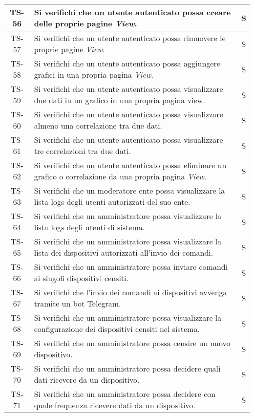 \begin{center}
\begin{longtable}{|c|p{10cm}|c|}
			 \hline
			 TS-56 & Si verifichi che un utente autenticato possa creare delle proprie pagine \textit{View}. & S \\
			 \hline
			 TS-57 & Si verifichi che un utente autenticato possa rimuovere le proprie pagine \textit{View}. & S \\
			 \hline
			 TS-58 & Si verifichi che un utente autenticato possa aggiungere grafici in una propria pagina  \textit{View}. & S \\
			 \hline
			 TS-59 & Si verifichi che un utente autenticato possa visualizzare due dati in un grafico in una propria pagina view. & S \\
			 \hline
			 TS-60 & Si verifichi che un utente autenticato possa visualizzare almeno una correlazione tra due dati. & S \\
			 \hline
			 TS-61 & Si verifichi che un utente autenticato possa visualizzare tre correlazioni tra due dati. & S \\
			 \hline
			 TS-62 & Si verifichi che un utente autenticato possa eliminare un grafico o correlazione da una propria pagina \textit{View}. & S \\
			 \hline
			 TS-63 & Si verifichi che un moderatore ente possa visualizzare la lista logs degli utenti autorizzati del suo ente. & S \\
			 \hline
			 TS-64 & Si verifichi che un amministratore possa visualizzare la lista logs degli utenti di sistema. & S \\
			 \hline
			 TS-65 & Si verifichi che un amministratore possa visualizzare la lista dei dispositivi autorizzati all'invio dei comandi. & S \\
			 \hline
			 TS-66 & Si verifichi che un amministratore possa inviare comandi ai singoli dispositivi censiti. & S \\
			 \hline
			 TS-67 & Si verifichi che l'invio dei comandi ai dispositivi avvenga tramite un bot Telegram. & S \\
			 \hline
			 TS-68 & Si verifichi che un amministratore possa visualizzare la configurazione dei dispositivi censiti nel sistema. & S \\
			 \hline
			 TS-69 & Si verifichi che un amministratore possa censire un nuovo dispositivo. & S \\
			 \hline
			 TS-70 & Si verifichi che un amministratore possa decidere quali dati ricevere da un dispositivo. & S \\
			 \hline
			 TS-71 & Si verifichi che un amministratore possa decidere con quale frequenza ricevere dati da un dispositivo. & S \\

\end{longtable}
\end{center}
